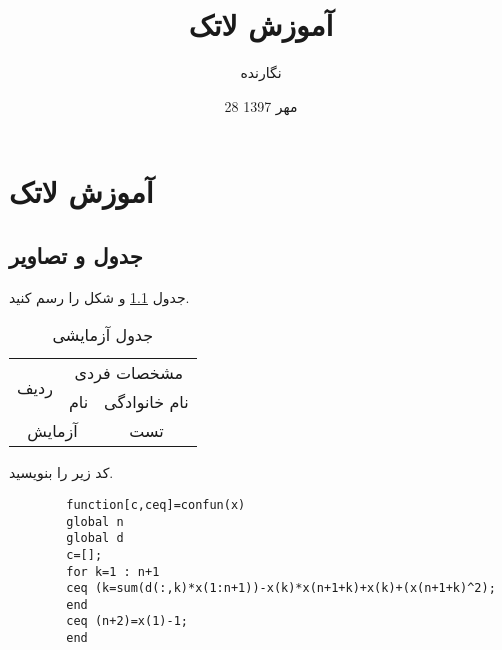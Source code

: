 \documentclass[openany,12pt]{book}
\title{آموزش لاتک}
\author{نگارنده}
\date{28 مهر 1397}
\begin{document}
	\maketitle
	\tableofcontents
	\listoffigures
	\listoftables
	\chapter{آموزش لاتک}
	\section{جدول و تصاویر}
					جدول 
	\ref{t1}
	و شکل 
	را رسم کنید.
	
	\begin{table}[h]
		\caption{جدول آزمایشی}
		\begin{center}
			\begin{tabular}{|c|c|c|}
				\hline
				\multirow{2}{*}{ردیف} &  \multicolumn{2}{c|}{مشخصات فردی} \\
				\cline{2-3}
				& نام & نام  خانوادگی \\
				\hline
				\multicolumn{2}{|c}{آزمایش} &    تست  \\
				\hline
			\end{tabular}\label{t1}
		\end{center}	
	\end{table}

	کد زیر را بنویسید.
	
	\begin{latin}
		\begin{verbatim}
		function[c,ceq]=confun(x)
		global n
		global d
		c=[];
		for k=1 : n+1
		ceq (k=sum(d(:,k)*x(1:n+1))-x(k)*x(n+1+k)+x(k)+(x(n+1+k)^2);
		end
		ceq (n+2)=x(1)-1;
		end
		\end{verbatim}
	\end{latin}
\end{document}
